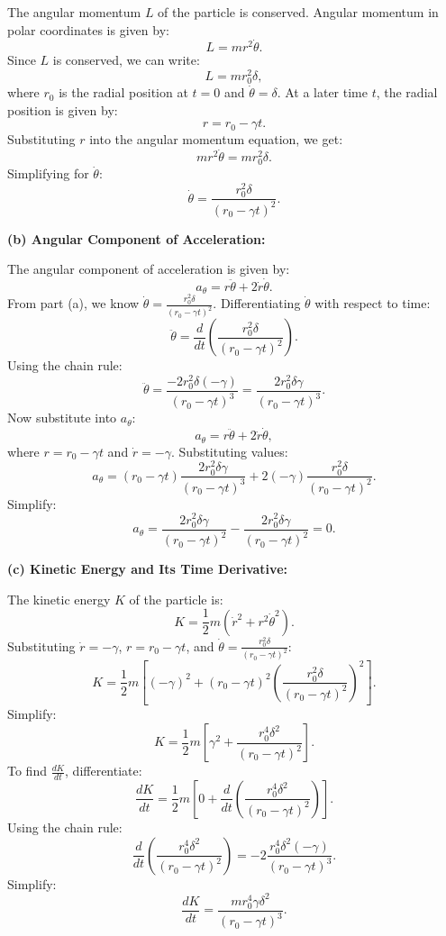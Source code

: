 \documentclass{article}
\begin{document}
The angular momentum \( L \) of the particle is conserved. Angular momentum in polar coordinates is given by:
\[
L = m r^2 \dot{\theta}.
\]
Since \( L \) is conserved, we can write:
\[
L = m r_0^2 \delta,
\]
where \( r_0 \) is the radial position at \( t = 0 \) and \( \dot{\theta} = \delta \). At a later time \( t \), the radial position is given by:
\[
r = r_0 - \gamma t.
\]
Substituting \( r \) into the angular momentum equation, we get:
\[
m r^2 \dot{\theta} = m r_0^2 \delta.
\]
Simplifying for \( \dot{\theta} \):
\[
\dot{\theta} = \frac{r_0^2 \delta}{(r_0 - \gamma t)^2}.
\]

\textbf{(b) Angular Component of Acceleration:}

The angular component of acceleration is given by:
\[
a_\theta = r \ddot{\theta} + 2 \dot{r} \dot{\theta}.
\]
From part (a), we know \( \dot{\theta} = \frac{r_0^2 \delta}{(r_0 - \gamma t)^2} \). Differentiating \( \dot{\theta} \) with respect to time:
\[
\ddot{\theta} = \frac{d}{dt} \left( \frac{r_0^2 \delta}{(r_0 - \gamma t)^2} \right).
\]
Using the chain rule:
\[
\ddot{\theta} = \frac{-2 r_0^2 \delta (-\gamma)}{(r_0 - \gamma t)^3} = \frac{2 r_0^2 \delta \gamma}{(r_0 - \gamma t)^3}.
\]
Now substitute into \( a_\theta \):
\[
a_\theta = r \ddot{\theta} + 2 \dot{r} \dot{\theta},
\]
where \( r = r_0 - \gamma t \) and \( \dot{r} = -\gamma \). Substituting values:
\[
a_\theta = (r_0 - \gamma t) \frac{2 r_0^2 \delta \gamma}{(r_0 - \gamma t)^3} + 2(-\gamma) \frac{r_0^2 \delta}{(r_0 - \gamma t)^2}.
\]
Simplify:
\[
a_\theta = \frac{2 r_0^2 \delta \gamma}{(r_0 - \gamma t)^2} - \frac{2 r_0^2 \delta \gamma}{(r_0 - \gamma t)^2} = 0.
\]

\textbf{(c) Kinetic Energy and Its Time Derivative:}

The kinetic energy \( K \) of the particle is:
\[
K = \frac{1}{2} m \left( \dot{r}^2 + r^2 \dot{\theta}^2 \right).
\]
Substituting \( \dot{r} = -\gamma \), \( r = r_0 - \gamma t \), and \( \dot{\theta} = \frac{r_0^2 \delta}{(r_0 - \gamma t)^2} \):
\[
K = \frac{1}{2} m \left[ (-\gamma)^2 + (r_0 - \gamma t)^2 \left( \frac{r_0^2 \delta}{(r_0 - \gamma t)^2} \right)^2 \right].
\]
Simplify:
\[
K = \frac{1}{2} m \left[ \gamma^2 + \frac{r_0^4 \delta^2}{(r_0 - \gamma t)^2} \right].
\]
To find \( \frac{dK}{dt} \), differentiate:
\[
\frac{dK}{dt} = \frac{1}{2} m \left[ 0 + \frac{d}{dt} \left( \frac{r_0^4 \delta^2}{(r_0 - \gamma t)^2} \right) \right].
\]
Using the chain rule:
\[
\frac{d}{dt} \left( \frac{r_0^4 \delta^2}{(r_0 - \gamma t)^2} \right) = -2 \frac{r_0^4 \delta^2 (-\gamma)}{(r_0 - \gamma t)^3}.
\]
Simplify:
\[
\frac{dK}{dt} = \frac{m r_0^4 \gamma \delta^2}{(r_0 - \gamma t)^3}.
\]
\end{document}
